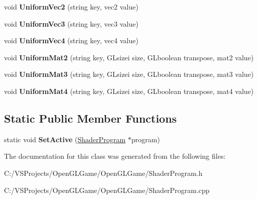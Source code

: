 \begin{DoxyCompactItemize}
\item 
\hypertarget{class_shader_program_a4f500bfcb9458ec38397d0eedb8851ac}{void {\bfseries Uniform\-Vec2} (string key, vec2 value)}\label{class_shader_program_a4f500bfcb9458ec38397d0eedb8851ac}

\item 
\hypertarget{class_shader_program_abc7aef0e73935e006e6ea8844f1afcc0}{void {\bfseries Uniform\-Vec3} (string key, vec3 value)}\label{class_shader_program_abc7aef0e73935e006e6ea8844f1afcc0}

\item 
\hypertarget{class_shader_program_ac5925e997decbe607020705454792a57}{void {\bfseries Uniform\-Vec4} (string key, vec4 value)}\label{class_shader_program_ac5925e997decbe607020705454792a57}

\item 
\hypertarget{class_shader_program_abc58fd72d372870ce63cb4c17926db31}{void {\bfseries Uniform\-Mat2} (string key, G\-Lsizei size, G\-Lboolean transpose, mat2 value)}\label{class_shader_program_abc58fd72d372870ce63cb4c17926db31}

\item 
\hypertarget{class_shader_program_a29f8e6c494f53a77d69113c73cdbc177}{void {\bfseries Uniform\-Mat3} (string key, G\-Lsizei size, G\-Lboolean transpose, mat3 value)}\label{class_shader_program_a29f8e6c494f53a77d69113c73cdbc177}

\item 
\hypertarget{class_shader_program_a43d4c9490e1daad505a9245291326322}{void {\bfseries Uniform\-Mat4} (string key, G\-Lsizei size, G\-Lboolean transpose, mat4 value)}\label{class_shader_program_a43d4c9490e1daad505a9245291326322}

\end{DoxyCompactItemize}
\subsection*{Static Public Member Functions}
\begin{DoxyCompactItemize}
\item 
\hypertarget{class_shader_program_a31991582d0389f65d11d8445112adb89}{static void {\bfseries Set\-Active} (\hyperlink{class_shader_program}{Shader\-Program} $\ast$program)}\label{class_shader_program_a31991582d0389f65d11d8445112adb89}

\end{DoxyCompactItemize}


The documentation for this class was generated from the following files\-:\begin{DoxyCompactItemize}
\item 
C\-:/\-V\-S\-Projects/\-Open\-G\-L\-Game/\-Open\-G\-L\-Game/Shader\-Program.\-h\item 
C\-:/\-V\-S\-Projects/\-Open\-G\-L\-Game/\-Open\-G\-L\-Game/Shader\-Program.\-cpp\end{DoxyCompactItemize}
